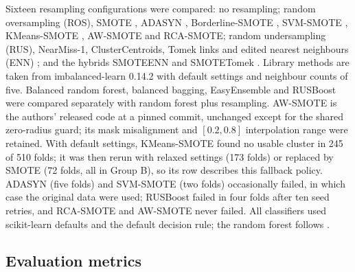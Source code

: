 \documentclass[preprint,nopreprintline]{elsarticle}
\theoremstyle{plain}
\theoremstyle{definition}
\begin{document}
Sixteen resampling configurations were compared: no resampling; random oversampling (ROS), SMOTE \cite{chawla2002smote}, ADASYN \cite{he2008adasyn}, Borderline-SMOTE \cite{han2005borderline}, SVM-SMOTE \cite{nguyen2011borderline}, KMeans-SMOTE \cite{douzas2018kmeans}, AW-SMOTE \cite{yan2026awsmote} and RCA-SMOTE; random undersampling (RUS), NearMiss-1, ClusterCentroids, Tomek links \cite{tomek1976two} and edited nearest neighbours (ENN) \cite{wilson1972asymptotic}; and the hybrids SMOTEENN and SMOTETomek \cite{batista2004study}. Library methods are taken from imbalanced-learn 0.14.2 \cite{lemaitre2017imbalanced} with default settings and neighbour counts of five. Balanced random forest, balanced bagging, EasyEnsemble \cite{liu2009exploratory} and RUSBoost \cite{seiffert2010rusboost} were compared separately with random forest plus resampling. AW-SMOTE is the authors' released code at a pinned commit, unchanged except for the shared zero-radius guard; its mask misalignment and $[0.2,0.8]$ interpolation range were retained. With default settings, KMeans-SMOTE found no usable cluster in 245 of 510 folds; it was then rerun with relaxed settings (173 folds) or replaced by SMOTE (72 folds, all in Group B), so its row describes this fallback policy. ADASYN (five folds) and SVM-SMOTE (two folds) occasionally failed, in which case the original data were used; RUSBoost failed in four folds after ten seed retries, and RCA-SMOTE and AW-SMOTE never failed. All classifiers used scikit-learn \cite{pedregosa2011scikit} defaults and the default decision rule; the random forest follows \cite{breiman2001random}.

\subsection{Evaluation metrics}\label{sec:metrics}
\end{document}
